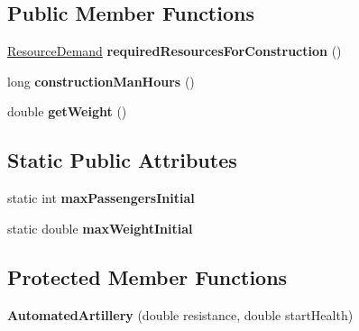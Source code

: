 \subsection*{Public Member Functions}
\begin{DoxyCompactItemize}
\item 
\hyperlink{classuniverse_1_1_resource_demand}{Resource\+Demand} {\bfseries required\+Resources\+For\+Construction} ()\hypertarget{classtools_1_1vehicles_1_1land_1_1_automated_artillery_ae1c91ee040eca83c584bc2537c8de0d6}{}\label{classtools_1_1vehicles_1_1land_1_1_automated_artillery_ae1c91ee040eca83c584bc2537c8de0d6}

\item 
long {\bfseries construction\+Man\+Hours} ()\hypertarget{classtools_1_1vehicles_1_1land_1_1_automated_artillery_a98ba1b9f53bdd245286e002675799ad9}{}\label{classtools_1_1vehicles_1_1land_1_1_automated_artillery_a98ba1b9f53bdd245286e002675799ad9}

\item 
double {\bfseries get\+Weight} ()\hypertarget{classtools_1_1vehicles_1_1land_1_1_automated_artillery_aa05e746f7bc673c761823274bd0fe4e0}{}\label{classtools_1_1vehicles_1_1land_1_1_automated_artillery_aa05e746f7bc673c761823274bd0fe4e0}

\end{DoxyCompactItemize}
\subsection*{Static Public Attributes}
\begin{DoxyCompactItemize}
\item 
static int {\bfseries max\+Passengers\+Initial}\hypertarget{classtools_1_1vehicles_1_1land_1_1_automated_artillery_a9a4b159282bc80abd45dfb0259c62f7c}{}\label{classtools_1_1vehicles_1_1land_1_1_automated_artillery_a9a4b159282bc80abd45dfb0259c62f7c}

\item 
static double {\bfseries max\+Weight\+Initial}\hypertarget{classtools_1_1vehicles_1_1land_1_1_automated_artillery_a3d10eb5cc25a16ed16d1f4ac9082c50c}{}\label{classtools_1_1vehicles_1_1land_1_1_automated_artillery_a3d10eb5cc25a16ed16d1f4ac9082c50c}

\end{DoxyCompactItemize}
\subsection*{Protected Member Functions}
\begin{DoxyCompactItemize}
\item 
{\bfseries Automated\+Artillery} (double resistance, double start\+Health)\hypertarget{classtools_1_1vehicles_1_1land_1_1_automated_artillery_a9d77ed58e361720bf1c520d4da3baf1a}{}\label{classtools_1_1vehicles_1_1land_1_1_automated_artillery_a9d77ed58e361720bf1c520d4da3baf1a}

\end{DoxyCompactItemize}
